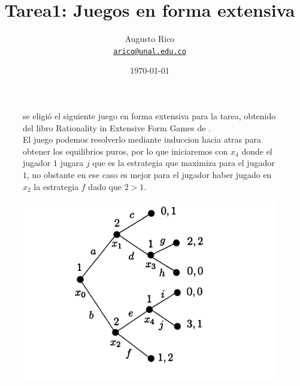 \documentclass[11pt]{article}
\title{Tarea1: Juegos en forma extensiva
}
\author{Augusto Rico\\
    \href{mailto:arico@unal.edu.co}{\texttt{arico@unal.edu.co}}}
\date{\today}
\begin{document}
\maketitle


\begin{figure}[h]
    \begin{minipage}[t]{0.5\textwidth}
        \vspace{0pt}
        \begin{flushleft}
        se eligió el siguiente juego en forma extensiva para la tarea,
        obtenido del libro Rationality in Extensive Form Games de \citet{Perea_2001}.\\
        El juego podemos resolverlo mediante induccion hacia atras para obtener los equilibrios
        puros, por lo que iniciaremos con $x_4$ donde el jugador $1$ jugara $j$ que es la estrategia
        que maximiza para el jugador $1$, no obstante en ese caso es mejor para el jugador haber jugado en $x_2$
        la estrategia $f$ dado que $2>1$.\\
        \end{flushleft}
    \end{minipage}
    \hfill
    \begin{minipage}[t]{0.5\textwidth}
        \vspace{0pt}
        \includegraphics[width=\textwidth]{Screenshot from 2023-05-23 15-21-47.png}
        \label{fig:my_label}
    \end{minipage}
\end{figure}
\end{document}
